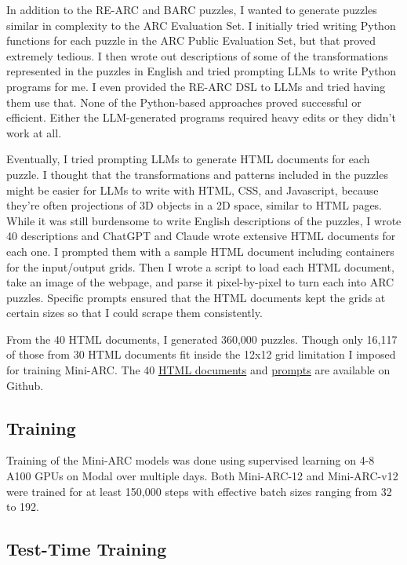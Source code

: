 \documentclass[10pt,twocolumn]{article}
\begin{document}
In addition to the RE-ARC and BARC puzzles, I wanted to generate
puzzles similar in complexity to the ARC Evaluation Set. I initially
tried writing Python functions for each puzzle in the
ARC Public Evaluation Set, but that proved extremely tedious. I then
wrote out descriptions of some of the transformations represented in
the puzzles in English and tried prompting LLMs to
write Python programs for me. I even provided the RE-ARC DSL to LLMs
and tried having them use that. None of the Python-based approaches
proved successful or efficient. Either the
LLM-generated programs required heavy edits or they didn't work at all.

Eventually, I tried prompting LLMs to generate HTML
documents for each puzzle. I thought that the transformations and
patterns included in the puzzles might be easier for LLMs to write
with HTML, CSS, and Javascript, because they're often projections of
3D objects in a 2D space, similar to HTML pages. While it was still
burdensome to write English descriptions of the puzzles, I wrote 40
descriptions and ChatGPT and Claude wrote extensive HTML documents
for each one. I prompted them with a sample HTML document including
containers for the input/output grids. Then I wrote a script to load
each HTML document, take an image of the webpage, and parse it
pixel-by-pixel to turn each into ARC puzzles. Specific prompts
ensured that the HTML documents kept the grids at certain sizes so
that I could scrape them consistently.

From the 40 HTML documents, I generated 360,000 puzzles. Though only
16,117 of those from 30 HTML documents fit inside the 12x12 grid
limitation I imposed for training Mini-ARC. The 40
\href{https://github.com/pfletcherhill/mini-arc/tree/main/html}{HTML
documents}
and
\href{https://github.com/pfletcherhill/mini-arc/tree/main/prompts}{prompts} are
available on Github.

\subsection{Training}

Training of the Mini-ARC models was done using supervised learning on
4-8 A100 GPUs on Modal\cite{modal}
over multiple days. Both Mini-ARC-12 and Mini-ARC-v12 were trained
for at least 150,000 steps with effective batch sizes ranging from 32 to 192.

\subsection{Test-Time Training}
\end{document}
